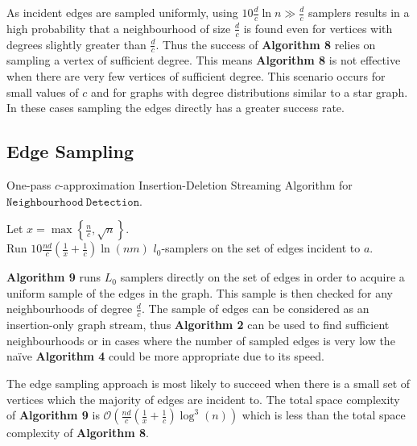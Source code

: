 \documentclass[11pt,twoside,a4paper]{report}
\begin{document}
\par As incident edges are sampled uniformly, using $10\frac{d}c\ln n\gg\frac{d}c$ samplers results in a high probability that a neighbourhood of size $\frac{d}c$ is found even for vertices with degrees slightly greater than $\frac{d}c$. Thus the success of \textbf{Algorithm 8} relies on sampling a vertex of sufficient degree. This means \textbf{Algorithm 8} is not effective when there are very few vertices of sufficient degree. This scenario occurs for small values of $c$ and for graphs with degree distributions similar to a star graph. In these cases sampling the edges directly has a greater success rate.

\subsection{Edge Sampling}

\begin{algorithm}
	\caption{One-pass $c$-approximation Insertion-Deletion Streaming Algorithm for $\mathtt{Neighbourhood\ Detection}$. }
	Let $x=\max\left\{\frac{n}{c},\sqrt{n}\right\}$.\\
	Run $10\frac{nd}{c}\left(\frac1x+\frac1c\right)\ln (nm)$ $l_0$-samplers on the set of edges incident to $a$.\\
\end{algorithm}

\par\textbf{Algorithm 9} runs $L_0$ samplers directly on the set of edges in order to acquire a uniform sample of the edges in the graph. This sample is then checked for any neighbourhoods of degree $\frac{d}c$. The sample of edges can be considered as an insertion-only graph stream, thus \textbf{Algorithm 2} can be used to find sufficient neighbourhoods or in cases where the number of sampled edges is very low the naïve \textbf{Algorithm 4} could be more appropriate due to its speed.
\par The edge sampling approach is most likely to succeed when there is a small set of vertices which the majority of edges are incident to. The total space complexity of \textbf{Algorithm 9} is $\mathcal{O}\left(\frac{nd}c\left(\frac1x+\frac1c\right)\log^3(n)\right)$ which is less than the total space complexity of \textbf{Algorithm 8}. %
\end{document}
